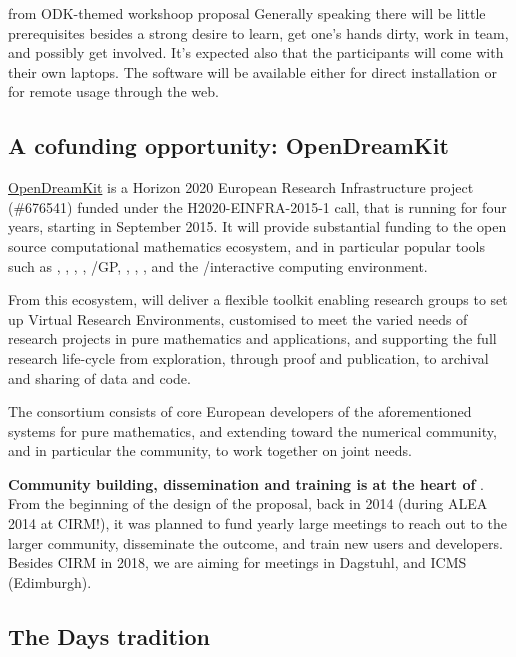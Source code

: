 \begin{oldpart}{from ODK-themed workshoop proposal}
Generally speaking there will be little prerequisites besides a strong
desire to learn, get one's hands dirty, work in team, and possibly get
involved. It's expected also that the participants will come with
their own laptops. The software will be available either for direct
installation or for remote usage through the web.

\subsection{A cofunding opportunity: OpenDreamKit}

\href{http://opendreamkit.org}{OpenDreamKit} is a Horizon 2020
European Research Infrastructure project (\#676541) funded under the
H2020-EINFRA-2015-1 call, that is running for four years, starting in
September 2015. It will provide substantial funding to the open source
computational mathematics ecosystem, and in particular popular tools
such as \Linbox, \MPIR, \Sage, \GAP, \Pari/GP, \LMFDB, \Singular,
\MathHub, and the \IPython/\Jupyter interactive computing environment.

From this ecosystem, \ODK will deliver a flexible toolkit enabling
research groups to set up Virtual Research Environments, customised to
meet the varied needs of research projects in pure mathematics and
applications, and supporting the full research life-cycle from
exploration, through proof and publication, to archival and sharing of
data and code.

The \ODK  consortium consists of core European developers of the
aforementioned systems for pure mathematics, and extending toward the
numerical community, and in particular the \Jupyter  community, to work
together on joint needs.

\textbf{Community building, dissemination and training is at the heart of \ODK}. From the
beginning of the design of the proposal, back in 2014 (during ALEA
2014 at CIRM!), it was planned to fund yearly large meetings to reach
out to the larger community, disseminate the outcome, and train new
users and developers. Besides CIRM in 2018, we are aiming for meetings
in Dagstuhl, and ICMS (Edimburgh).


\subsection{The \Sage Days tradition}


\end{oldpart}
